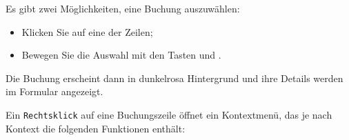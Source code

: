 Es gibt zwei Möglichkeiten, eine Buchung auszuwählen:
\begin{itemize}
	\item Klicken Sie auf eine der Zeilen;
	\item Bewegen Sie die Auswahl mit den Tasten \keys{\arrowkeyup} und \keys{\arrowkeydown}.
\end{itemize}

Die Buchung erscheint dann in {\setlength{\fboxsep}{2pt}\colorbox[RGB]{245,155,155}{dunkelrosa Hintergrund}} und ihre Details werden im Formular angezeigt.

Ein \texttt{Rechtsklick} auf eine Buchungszeile öffnet ein Kontextmenü, das je nach Kontext die folgenden Funktionen enthält:

